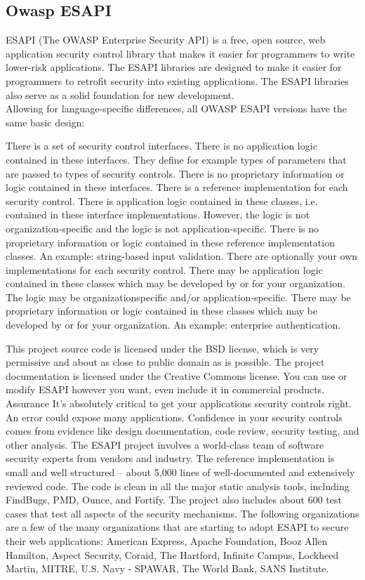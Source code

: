 \subsection{Owasp ESAPI}
ESAPI (The OWASP Enterprise Security API) is a free, open source, web application security control library that makes it easier for programmers to write lower-risk applications. The ESAPI libraries are designed to make it easier for programmers to retrofit security into existing applications. The ESAPI libraries also serve as a solid foundation for new development.\\
Allowing for language-specific differences, all OWASP ESAPI versions have the same basic design:
\begin{itemize}
	\itemcheck There is a set of security control interfaces. There is no application logic
	contained in these interfaces. They define for example types of parameters
	that are passed to types of security controls. There is no proprietary
	information or logic contained in these interfaces.
	\itemcheck There is a reference implementation for each security control. There is
	application logic contained in these classes, i.e. contained in these interface
	implementations. However, the logic is not organization-specific and the
	logic is not application-specific. There is no proprietary information or
	logic contained in these reference implementation classes. An example:
	string-based input validation.
	\itemcheck There are optionally your own implementations for each security control.
	There may be application logic contained in these classes which may be
	developed by or for your organization. The logic may be organizationspecific
	and/or application-specific. There may be proprietary
	information or logic contained in these classes which may be developed
	by or for your organization. An example: enterprise authentication.
\end{itemize}
This project source code is licensed under the BSD license, which is very permissive and about as close to public domain as is possible. The project documentation is licensed under the Creative Commons license. You can use or modify ESAPI however you want, even include it in commercial products.
Assurance
It’s absolutely critical to get your applications security controls right. An error could expose many
applications. Confidence in your security controls comes from evidence like design documentation, code review, security testing, and other analysis. The ESAPI project involves a world-class team of software security experts from vendors and industry. The reference implementation is small and well structured – about 5,000 lines of well-documented and extensively reviewed code. The code is clean in all the major static analysis tools, including FindBugs, PMD, Ounce, and Fortify. The project also includes about 600 test cases that test all aspects of the security mechanisms. 
The following organizations are a few of the many organizations that are starting to adopt ESAPI to secure their web applications: American Express, Apache Foundation, Booz Allen Hamilton, Aspect Security, Coraid, The Hartford, Infinite Campus, Lockheed Martin, MITRE, U.S. Navy - SPAWAR, The World Bank, SANS Institute.


